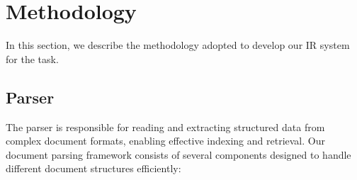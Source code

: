 \section{Methodology}
\label{sec:methodology}

In this section, we describe the methodology adopted to develop our IR system for the task.


\subsection{Parser}
The parser is responsible for reading and extracting structured data from complex document formats, enabling effective indexing and retrieval. Our document parsing framework consists of several components designed to handle different document structures efficiently:

